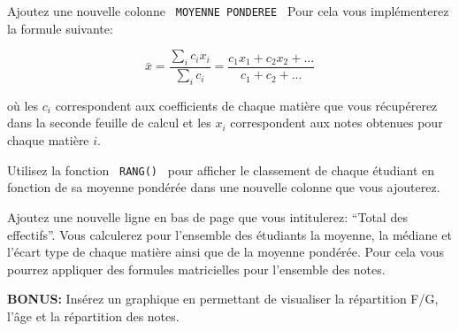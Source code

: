 \documentclass[a4paper, 8pt]{article}
\begin{document}
\exost Ajoutez une nouvelle colonne \verb? MOYENNE PONDEREE ? Pour cela vous impl\'ementerez la formule suivante:

\begin{equation}
 \bar{x} = \frac{\sum_i c_i x_i}{\sum_i c_i} = \frac{c_1 x_1 + c_2 x_2 + ...}{c_1 + c_2 + ...}
\end{equation}

o\`u les $c_i$ correspondent aux coefficients de chaque mati\`ere que vous r\'ecup\'ererez dans la seconde feuille de calcul et
les $x_i$ correspondent aux notes obtenues pour chaque mati\`ere $i$.

\exost Utilisez la fonction \verb? RANG() ? pour afficher le classement de chaque \'etudiant en fonction de sa moyenne pond\'er\'ee
dans une nouvelle colonne que vous ajouterez.


\exost Ajoutez une nouvelle ligne en bas de page que vous intitulerez: ``Total des effectifs''.
Vous calculerez pour l'ensemble des \'etudiants la moyenne, la m\'ediane et l'\'ecart type de chaque mati\`ere ainsi que de la moyenne pond\'er\'ee.
Pour cela vous pourrez appliquer des formules matricielles pour l'ensemble des notes.


\textbf{BONUS:} Ins\'erez un graphique en permettant de visualiser la r\'epartition F/G, l'\^age et la r\'epartition des notes.
\end{document}
